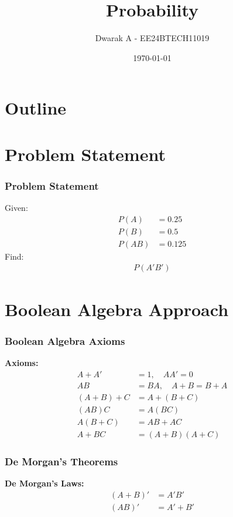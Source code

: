 \documentclass{beamer}
\title{Probability}
\author{Dwarak A - EE24BTECH11019}
\date{\today}
\begin{document}
\begin{frame}
    \titlepage
\end{frame}

\section*{Outline}
\begin{frame}
    \tableofcontents
\end{frame}

\section{Problem Statement}
\begin{frame}
    \frametitle{Problem Statement}
    Given:
    \begin{align}
        P(A) &= 0.25 \\
        P(B) &= 0.5 \\
        P(AB) &= 0.125
    \end{align}
    Find:
    \begin{align}
        P(A' B')
    \end{align}
\end{frame}

\section{Boolean Algebra Approach}
\begin{frame}
    \frametitle{Boolean Algebra Axioms}
    \textbf{Axioms:}
    \begin{align}
        A + A' &= 1, \quad AA' = 0 \\
        AB &= BA, \quad A + B = B + A\\
        (A + B) + C &= A + (B + C) \\
        (AB)C &= A(BC) \\
        A(B + C) &= AB + AC \\
        A + BC &= (A + B)(A + C)
    \end{align}
\end{frame}

\begin{frame}
    \frametitle{De Morgan's Theorems}
    \textbf{De Morgan’s Laws:}
    \begin{align}
        (A + B)' &= A' B'  \\
        (AB)' &= A' + B'
    \end{align}
\end{frame}
\end{document}
